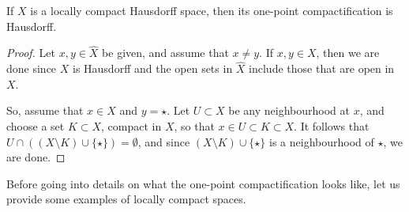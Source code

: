 \begin{prop}
  If $X$ is a locally compact Hausdorff space, then its one-point compactification is Hausdorff.
\end{prop}
\begin{proof}
  Let $x,y \in \hat{X}$ be given, and assume that $x \not= y$. If $x,y \in X$, then we are done since $X$ is Hausdorff and the open sets in $\hat{X}$ include those that are open in $X$.
  
  So, assume that $x \in X$ and $y = \star$. Let $U \subset X$ be any neighbourhood at $x$, and choose a set $K \subset X$, compact in $X$, so that $x \in U \subset K \subset X$. It follows that $U \cap ((X \setminus K) \cup \{\star\}) = \emptyset$, and since $(X \setminus K) \cup \{\star\}$ is a neighbourhood of $\star$, we are done.
\end{proof}

Before going into details on what the one-point compactification looks like, let us provide some examples of locally compact spaces.

